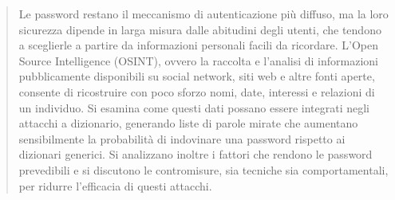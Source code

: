 \begin{abstract}
    Le password restano il meccanismo di autenticazione più diffuso, ma la loro sicurezza dipende in larga misura dalle abitudini degli utenti, che tendono a sceglierle a partire da informazioni personali facili da ricordare.
    L'Open Source Intelligence (OSINT), ovvero la raccolta e l'analisi di informazioni pubblicamente disponibili su social network, siti web e altre fonti aperte, consente di ricostruire con poco sforzo nomi, date, interessi e relazioni di un individuo.
    Si esamina come questi dati possano essere integrati negli attacchi a dizionario, generando liste di parole mirate che aumentano sensibilmente la probabilità di indovinare una password rispetto ai dizionari generici.
    Si analizzano inoltre i fattori che rendono le password prevedibili e si discutono le contromisure, sia tecniche sia comportamentali, per ridurre l'efficacia di questi attacchi.
\end{abstract}
